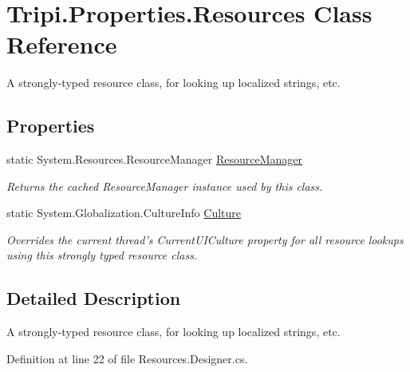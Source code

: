 \hypertarget{class_tripi_1_1_properties_1_1_resources}{
\section{Tripi.Properties.Resources Class Reference}
\label{class_tripi_1_1_properties_1_1_resources}
}


A strongly-\/typed resource class, for looking up localized strings, etc.  
\subsection*{Properties}
\begin{DoxyCompactItemize}
\item 
static System.Resources.ResourceManager \hyperlink{class_tripi_1_1_properties_1_1_resources_a55e52bf169d41ab0d6b39c550af07dce}{ResourceManager}
\begin{DoxyCompactList}\small\item\em Returns the cached ResourceManager instance used by this class. \item\end{DoxyCompactList}\item 
static System.Globalization.CultureInfo \hyperlink{class_tripi_1_1_properties_1_1_resources_a054adc4a9f974e93fa56b217b34c54f3}{Culture}
\begin{DoxyCompactList}\small\item\em Overrides the current thread's CurrentUICulture property for all resource lookups using this strongly typed resource class. \item\end{DoxyCompactList}\end{DoxyCompactItemize}


\subsection{Detailed Description}
A strongly-\/typed resource class, for looking up localized strings, etc. 

Definition at line 22 of file Resources.Designer.cs.

